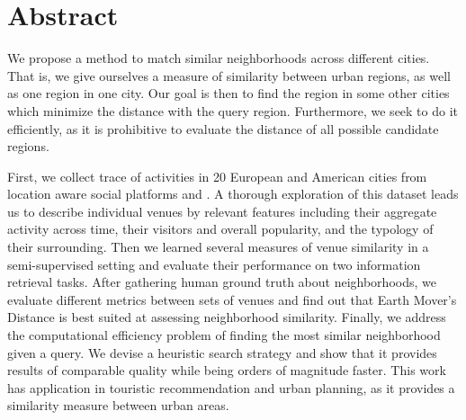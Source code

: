 \begingroup
\let\clearpage\relax

\chapter*{Abstract}

We propose a method to match similar neighborhoods across different cities.
That is, we give ourselves a measure of similarity between urban regions, as
well as one region in one city. Our goal is then to find the region in some
other cities which minimize the distance with the query region. Furthermore,
we seek to do it efficiently, as it is prohibitive to evaluate the distance of
all possible candidate regions.

First, we collect trace of activities in 20 European and American cities from
location aware social platforms \fs{} and \flickr{}. A thorough exploration of
this dataset leads us to describe individual venues by relevant features
including their aggregate activity across time, their visitors and overall
popularity, and the typology of their surrounding.  Then we learned several
measures of venue similarity in a semi-supervised setting and evaluate their
performance on two information retrieval tasks.  After gathering human ground
truth about neighborhoods, we evaluate different metrics between sets of
venues and find out that Earth Mover's Distance is best suited at assessing
neighborhood similarity. Finally, we address the computational efficiency
problem of finding the most similar neighborhood given a query. We devise a
heuristic search strategy and show that it provides results of comparable
quality while being orders of magnitude faster. This work has application in
touristic recommendation and urban planning, as it provides a similarity
measure between urban areas.

\endgroup 
\vfill
